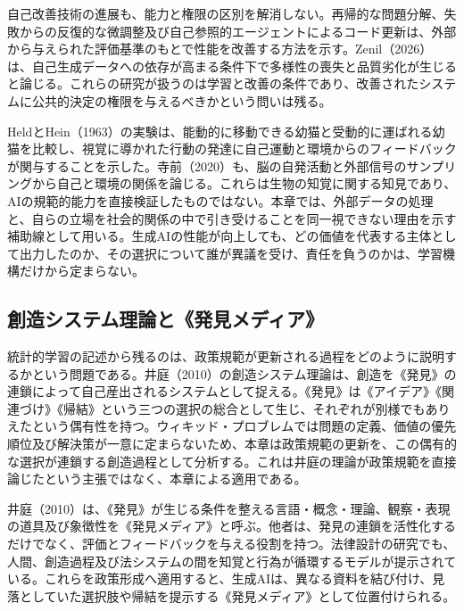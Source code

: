 自己改善技術の進展も、能力と権限の区別を解消しない。再帰的な問題分解\cite{simonds2025ladder}、失敗からの反復的な微調整\cite{qu2024recursive}及び自己参照的エージェントによるコード更新\cite{yin2024godel}は、外部から与えられた評価基準のもとで性能を改善する方法を示す。Zenil（2026）は、自己生成データへの依存が高まる条件下で多様性の喪失と品質劣化が生じると論じる\cite{zenil2026limits}。これらの研究が扱うのは学習と改善の条件であり、改善されたシステムに公共的決定の権限を与えるべきかという問いは残る。

HeldとHein（1963）の実験は、能動的に移動できる幼猫と受動的に運ばれる幼猫を比較し、視覚に導かれた行動の発達に自己運動と環境からのフィードバックが関与することを示した\cite{held1963}。寺前（2020）も、脳の自発活動と外部信号のサンプリングから自己と環境の関係を論じる\cite{teramae2020}。これらは生物の知覚に関する知見であり、AIの規範的能力を直接検証したものではない。本章では、外部データの処理と、自らの立場を社会的関係の中で引き受けることを同一視できない理由を示す補助線として用いる。生成AIの性能が向上しても、どの価値を代表する主体として出力したのか、その選択について誰が異議を受け、責任を負うのかは、学習機構だけから定まらない。

\subsection{創造システム理論と《発見メディア》}

統計的学習の記述から残るのは、政策規範が更新される過程をどのように説明するかという問題である。井庭（2010）の創造システム理論は、創造を《発見》の連鎖によって自己産出されるシステムとして捉える\cite{iba2010autopoietic}。《発見》は《アイデア》《関連づけ》《帰結》という三つの選択の総合として生じ、それぞれが別様でもありえたという偶有性を持つ。ウィキッド・プロブレムでは問題の定義、価値の優先順位及び解決策が一意に定まらないため、本章は政策規範の更新を、この偶有的な選択が連鎖する創造過程として分析する。これは井庭の理論が政策規範を直接論じたという主張ではなく、本章による適用である。

井庭（2010）は、《発見》が生じる条件を整える言語・概念・理論、観察・表現の道具及び象徴性を《発見メディア》と呼ぶ\cite{iba2010autopoietic}。他者は、発見の連鎖を活性化するだけでなく、評価とフィードバックを与える役割を持つ\cite{sakama2017coins}。法律設計の研究でも、人間、創造過程及び法システムの間を知覚と行為が循環するモデルが提示されている\cite{santuber2020legaldesign_verified}。これらを政策形成へ適用すると、生成AIは、異なる資料を結び付け、見落としていた選択肢や帰結を提示する《発見メディア》として位置付けられる。


